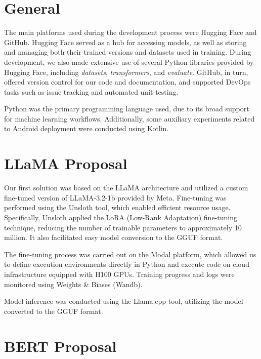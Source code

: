 \documentclass[licencjacka,en]{pracamgr}
\begin{document}
\section{General}

The main platforms used during the development process were Hugging Face\cite{hugging-face} and GitHub\cite{github}. Hugging Face served as a hub for accessing models, as well as storing and managing both their trained versions and datasets used in training. During development, we also made extensive use of several Python libraries provided by Hugging Face, including \textit{datasets}\cite{lhoest2021datasetscommunitylibrarynatural}, \textit{transformers}\cite{wolf-etal-2020-transformers}, and \textit{evaluate}\cite{evaluate}. GitHub, in turn, offered version control for our code and documentation, and supported DevOps tasks such as issue tracking and automated unit testing.

Python\cite{python} was the primary programming language used, due to its broad support for machine learning workflows. Additionally, some auxiliary experiments related to Android deployment were conducted using Kotlin\cite{kotlin, service_demo_app_repo}.

\section{LLaMA Proposal}

Our first solution was based on the LLaMA architecture and utilized a custom fine-tuned version of LLaMA-3.2-1b provided by Meta\cite{meta-llama}. Fine-tuning was performed using the Unsloth\cite{unsloth} tool, which enabled efficient resource usage. Specifically, Unsloth applied the LoRA (Low-Rank Adaptation) fine-tuning technique\cite{hu2021loralowrankadaptationlarge}, reducing the number of trainable parameters to approximately 10 million. It also facilitated easy model conversion to the GGUF format.

The fine-tuning process was carried out on the Modal platform\cite{modal}, which allowed us to define execution environments directly in Python and execute code on cloud infrastructure equipped with H100 GPUs. Training progress and logs were monitored using Weights \& Biases (Wandb)\cite{wandb}.

Model inference was conducted using the Llama.cpp\cite{llama-cpp} tool, utilizing the model converted to the GGUF format.

\section{BERT Proposal}
\end{document}
